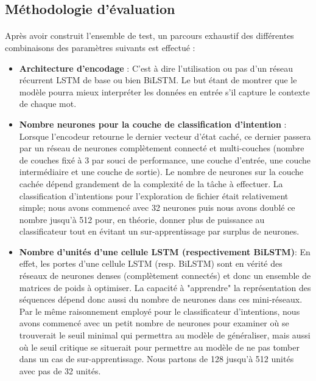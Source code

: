 	\subsection{Méthodologie d'évaluation}
	\label{nlu_steps}
	\paragraph{}
	Après avoir construit l'ensemble de test, un parcours exhaustif des différentes combinaisons des paramètres suivants est effectué : 
	\begin{itemize}
		\item \textbf{Architecture d'encodage} :
		C'est à dire l'utilisation ou pas d'un réseau récurrent LSTM de base ou bien BiLSTM. Le but étant de montrer que le modèle pourra mieux interpréter les données en entrée s'il capture le contexte de chaque mot.
		
		\item \textbf{Nombre neurones pour la couche de classification d'intention } : Lorsque l'encodeur retourne le dernier vecteur d'état caché, ce dernier passera par un réseau de neurones complètement connecté et multi-couches (nombre de couches fixé à 3 par souci de performance, une couche d'entrée, une couche intermédiaire et une couche de sortie). Le nombre de neurones sur la couche cachée dépend grandement de la complexité de la tâche à effectuer. La classification d'intentions pour l'exploration de fichier était relativement simple; nous avons commencé avec 32 neurones puis nous avons doublé ce nombre jusqu'à 512 pour, en théorie, donner plus de puissance au classificateur tout en évitant un sur-apprentissage par surplus de neurones.
		
		\item \textbf{Nombre d'unités d'une cellule LSTM (respectivement BiLSTM)}:
		En effet, les portes d'une cellule LSTM (resp. BiLSTM) sont en vérité des réseaux de neurones denses (complètement connectés) et donc un ensemble de matrices de poids à optimiser. La capacité à "apprendre" la représentation des séquences dépend donc aussi du nombre de neurones dans ces mini-réseaux. Par le même raisonnement employé pour le classificateur d'intentions, nous avons commencé avec un petit nombre de neurones pour examiner où se trouverait le seuil minimal qui permettra au modèle de généraliser, mais aussi où le seuil critique se situerait pour permettre au modèle de ne pas tomber dans un cas de sur-apprentissage. Nous partons de 128 jusqu'à 512 unités avec pas de 32 unités.
		

\end{itemize}

